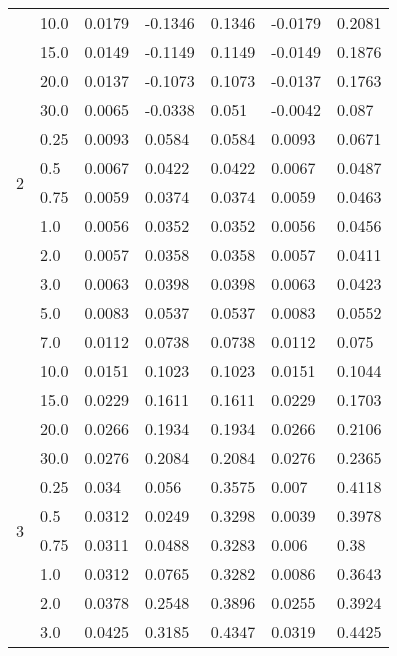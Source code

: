 \begin{table}[htbp]
\begin{tabular}{|l|l|l|l|l|l|l|}
                        &10.0&0.0179&-0.1346&0.1346&-0.0179&0.2081\\ \cline{2-7}
                        &15.0&0.0149&-0.1149&0.1149&-0.0149&0.1876\\ \cline{2-7}
                        &20.0&0.0137&-0.1073&0.1073&-0.0137&0.1763\\ \cline{2-7}
                        &30.0&0.0065&-0.0338&0.051&-0.0042&0.087\\ \hline
        \multirow{4}{*}{2}&0.25&0.0093&0.0584&0.0584&0.0093&0.0671\\ \cline{2-7}
                        &0.5&0.0067&0.0422&0.0422&0.0067&0.0487\\ \cline{2-7}
                        &0.75&0.0059&0.0374&0.0374&0.0059&0.0463\\ \cline{2-7}
                        &1.0&0.0056&0.0352&0.0352&0.0056&0.0456\\ \cline{2-7}
                        &2.0&0.0057&0.0358&0.0358&0.0057&0.0411\\ \cline{2-7}
                        &3.0&0.0063&0.0398&0.0398&0.0063&0.0423\\ \cline{2-7}
                        &5.0&0.0083&0.0537&0.0537&0.0083&0.0552\\ \cline{2-7}
                        &7.0&0.0112&0.0738&0.0738&0.0112&0.075\\ \cline{2-7}
                        &10.0&0.0151&0.1023&0.1023&0.0151&0.1044\\ \cline{2-7}
                        &15.0&0.0229&0.1611&0.1611&0.0229&0.1703\\ \cline{2-7}
                        &20.0&0.0266&0.1934&0.1934&0.0266&0.2106\\ \cline{2-7}
                        &30.0&0.0276&0.2084&0.2084&0.0276&0.2365\\ \hline
        \multirow{4}{*}{3}&0.25&0.034&0.056&0.3575&0.007&0.4118\\ \cline{2-7}
                        &0.5&0.0312&0.0249&0.3298&0.0039&0.3978\\ \cline{2-7}
                        &0.75&0.0311&0.0488&0.3283&0.006&0.38\\ \cline{2-7}
                        &1.0&0.0312&0.0765&0.3282&0.0086&0.3643\\ \cline{2-7}
                        &2.0&0.0378&0.2548&0.3896&0.0255&0.3924\\ \cline{2-7}
                        &3.0&0.0425&0.3185&0.4347&0.0319&0.4425\\ \cline{2-7}

\end{tabular}
\end{table}
